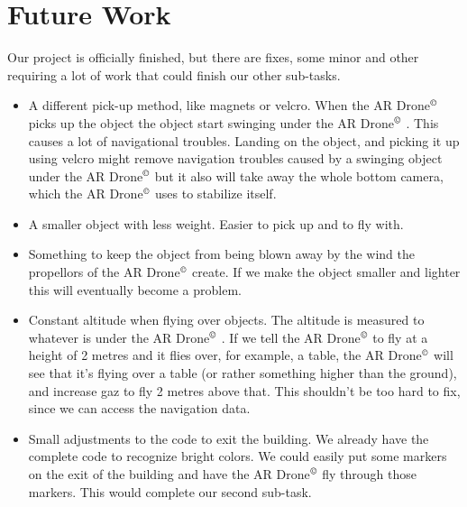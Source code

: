 \documentclass[a4paper,10pt]{article}
\newcommand{\Ardrone}{AR Drone$^{\copyright}$ }
\begin{document}
\section{Future Work}
Our project is officially finished, but there are fixes, some minor and other requiring a lot of work that could finish our other sub-tasks.
\begin{itemize}
    \item A different pick-up method, like magnets or velcro. When the \Ardrone picks up the object the object start swinging under the \Ardrone. This causes a lot of
navigational troubles. Landing on the object, and picking it up using velcro might remove navigation troubles caused by a swinging object under the \Ardrone but it 
also will take away the whole bottom camera, which the \Ardrone uses to stabilize itself.
    \item A smaller object with less weight. Easier to pick up and to fly with. 
    \item Something to keep the object from being blown away by the wind the
    propellors of the \Ardrone create. If we make the object smaller and lighter
    this will eventually
become a problem.
    \item Constant altitude when flying over objects. The altitude is measured to whatever is under the \Ardrone. If we tell the \Ardrone to fly at a height of 2 metres
and it flies over, for example, a table, the \Ardrone will see that it's flying over a table (or rather something higher than the ground), and increase gaz to fly 2 metres above
that. This shouldn't be too hard to fix, since we can access the navigation
data. 
    \item Small adjustments to the code to exit the building. We already have the complete code to recognize bright colors. We could easily put some markers on the
exit of the building and have the \Ardrone fly through those markers. This would complete our second sub-task.
\end{itemize}
\end{document}
